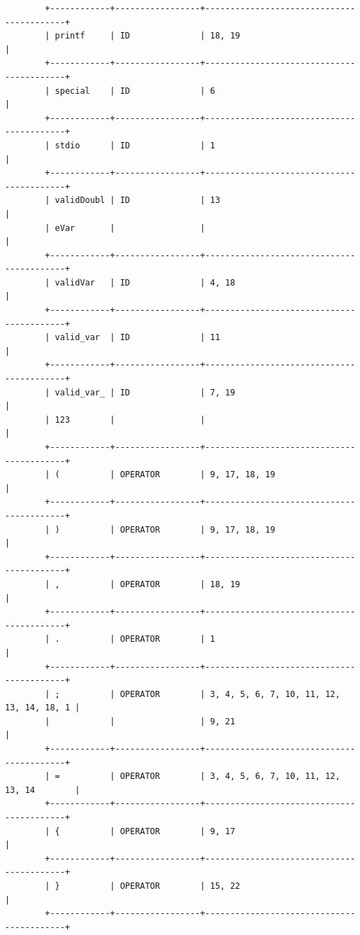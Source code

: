 \documentclass[a4paper,12pt]{article}
\begin{document}
\begin{flushleft}
\begin{verbatim}
		+------------+-----------------+------------------------------------------+
		| printf     | ID              | 18, 19                                   |
		+------------+-----------------+------------------------------------------+
		| special    | ID              | 6                                        |
		+------------+-----------------+------------------------------------------+
		| stdio      | ID              | 1                                        |
		+------------+-----------------+------------------------------------------+
		| validDoubl | ID              | 13                                       |
		| eVar       |                 |                                          |
		+------------+-----------------+------------------------------------------+
		| validVar   | ID              | 4, 18                                    |
		+------------+-----------------+------------------------------------------+
		| valid_var  | ID              | 11                                       |
		+------------+-----------------+------------------------------------------+
		| valid_var_ | ID              | 7, 19                                    |
		| 123        |                 |                                          |
		+------------+-----------------+------------------------------------------+
		| (          | OPERATOR        | 9, 17, 18, 19                            |
		+------------+-----------------+------------------------------------------+
		| )          | OPERATOR        | 9, 17, 18, 19                            |
		+------------+-----------------+------------------------------------------+
		| ,          | OPERATOR        | 18, 19                                   |
		+------------+-----------------+------------------------------------------+
		| .          | OPERATOR        | 1                                        |
		+------------+-----------------+------------------------------------------+
		| ;          | OPERATOR        | 3, 4, 5, 6, 7, 10, 11, 12, 13, 14, 18, 1 |
		|            |                 | 9, 21                                    |
		+------------+-----------------+------------------------------------------+
		| =          | OPERATOR        | 3, 4, 5, 6, 7, 10, 11, 12, 13, 14        |
		+------------+-----------------+------------------------------------------+
		| {          | OPERATOR        | 9, 17                                    |
		+------------+-----------------+------------------------------------------+
		| }          | OPERATOR        | 15, 22                                   |
		+------------+-----------------+------------------------------------------+

\end{verbatim}
\end{flushleft}
\end{document}

